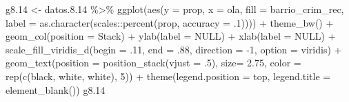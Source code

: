 \documentclass[
  12pt,
]{book}
\newenvironment{Shaded}{\begin{snugshade}}{\end{snugshade}}
\newcommand{\AttributeTok}[1]{\textcolor[rgb]{0.77,0.63,0.00}{#1}}
\newcommand{\ConstantTok}[1]{\textcolor[rgb]{0.00,0.00,0.00}{#1}}
\newcommand{\DecValTok}[1]{\textcolor[rgb]{0.00,0.00,0.81}{#1}}
\newcommand{\FloatTok}[1]{\textcolor[rgb]{0.00,0.00,0.81}{#1}}
\newcommand{\FunctionTok}[1]{\textcolor[rgb]{0.00,0.00,0.00}{#1}}
\newcommand{\NormalTok}[1]{#1}
\newcommand{\OtherTok}[1]{\textcolor[rgb]{0.56,0.35,0.01}{#1}}
\newcommand{\SpecialCharTok}[1]{\textcolor[rgb]{0.00,0.00,0.00}{#1}}
\newcommand{\StringTok}[1]{\textcolor[rgb]{0.31,0.60,0.02}{#1}}
\begin{document}
\begin{Shaded}
\begin{Highlighting}[]
\NormalTok{g8}\FloatTok{.14} \OtherTok{\textless{}{-}}\NormalTok{ datos.}\FloatTok{8.14} \SpecialCharTok{\%\textgreater{}\%} 
  \FunctionTok{ggplot}\NormalTok{(}\FunctionTok{aes}\NormalTok{(}\AttributeTok{y =}\NormalTok{ prop, }\AttributeTok{x =}\NormalTok{ ola, }\AttributeTok{fill =}\NormalTok{ barrio\_crim\_rec, }
             \AttributeTok{label =} \FunctionTok{as.character}\NormalTok{(scales}\SpecialCharTok{::}\FunctionTok{percent}\NormalTok{(prop, }\AttributeTok{accuracy =}\NormalTok{ .}\DecValTok{1}\NormalTok{)))) }\SpecialCharTok{+} 
  \FunctionTok{theme\_bw}\NormalTok{() }\SpecialCharTok{+} 
  \FunctionTok{geom\_col}\NormalTok{(}\AttributeTok{position =} \StringTok{\textquotesingle{}Stack\textquotesingle{}}\NormalTok{) }\SpecialCharTok{+}
  \FunctionTok{ylab}\NormalTok{(}\AttributeTok{label =} \ConstantTok{NULL}\NormalTok{) }\SpecialCharTok{+}
  \FunctionTok{xlab}\NormalTok{(}\AttributeTok{label =} \ConstantTok{NULL}\NormalTok{) }\SpecialCharTok{+}
  \FunctionTok{scale\_fill\_viridis\_d}\NormalTok{(}\AttributeTok{begin =}\NormalTok{ .}\DecValTok{11}\NormalTok{, }\AttributeTok{end =}\NormalTok{ .}\DecValTok{88}\NormalTok{, }\AttributeTok{direction =} \SpecialCharTok{{-}}\DecValTok{1}\NormalTok{, }\AttributeTok{option =} \StringTok{\textquotesingle{}viridis\textquotesingle{}}\NormalTok{) }\SpecialCharTok{+}
  \FunctionTok{geom\_text}\NormalTok{(}\AttributeTok{position =} \FunctionTok{position\_stack}\NormalTok{(}\AttributeTok{vjust =}\NormalTok{ .}\DecValTok{5}\NormalTok{),}
            \AttributeTok{size=} \FloatTok{2.75}\NormalTok{, }\AttributeTok{color =} \FunctionTok{rep}\NormalTok{(}\FunctionTok{c}\NormalTok{(}\StringTok{\textquotesingle{}black\textquotesingle{}}\NormalTok{, }\StringTok{\textquotesingle{}white\textquotesingle{}}\NormalTok{, }\StringTok{\textquotesingle{}white\textquotesingle{}}\NormalTok{), }\DecValTok{5}\NormalTok{)) }\SpecialCharTok{+} 
  \FunctionTok{theme}\NormalTok{(}\AttributeTok{legend.position =} \StringTok{\textquotesingle{}top\textquotesingle{}}\NormalTok{, }\AttributeTok{legend.title =} \FunctionTok{element\_blank}\NormalTok{())}
\NormalTok{g8}\FloatTok{.14}
\end{Highlighting}
\end{Shaded}
\end{document}
